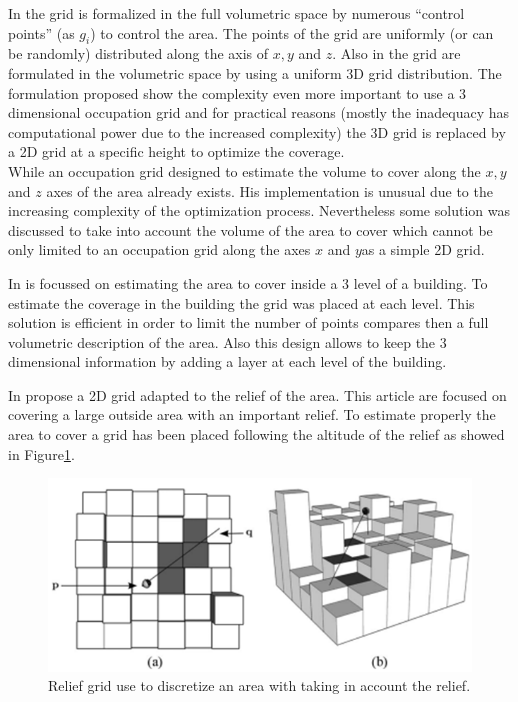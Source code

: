In \cite{82*chrysostomou2012} the grid is formalized in the full volumetric space by numerous “control points” (as $g_i$) to control the area. The points of the grid are uniformly (or can be randomly) distributed along the axis of $x, y$ and $z$. Also in \cite{87*morsly2012} the grid are formulated in the volumetric space by using a uniform 3D grid distribution. The formulation proposed show the complexity even more important to use a 3 dimensional occupation grid and for practical reasons (mostly the inadequacy has computational power due to the increased complexity) the 3D grid is replaced by a 2D grid at a specific height to optimize the coverage. \\ 

While an occupation grid designed to estimate the volume to cover along the $ x, y $ and $ z $ axes of the area already exists. His implementation is unusual due to the increasing complexity of the optimization process.  
Nevertheless some solution was discussed \citep{141*akbarzadeh2013,83*van2009} to take into account the volume of the area to cover which cannot be only limited to an occupation grid along the axes $ x $ and $ y $as a simple 2D grid.

In \cite{83*van2009} is focussed on estimating the area to cover inside a 3 level of a building. To estimate the coverage in the building the grid was placed at each level. This solution is efficient in order to limit the number of points compares then a full volumetric description of the area. Also this design allows to keep the 3 dimensional information by adding a layer at each level of the building.  

In \citep{141*akbarzadeh2013} propose a 2D grid adapted to the relief of the area. This article are focused on covering a large outside area with an important relief. To estimate properly the area to cover a grid has been placed following the altitude of the relief as showed in Figure\ref{fig:grilleRef141}. 

\begin{figure}[t!]
\begin{center}
   \includegraphics[width=\linewidth]{img/grilleRef141.png}
  \caption{ Relief grid use to discretize  an area with taking in account the relief.}\label{fig:grilleRef141}
  \endminipage\hfill
  \end{center}
\end{figure}

